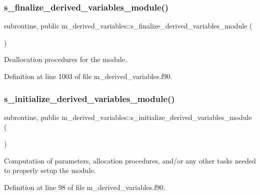 \subsubsection{\texorpdfstring{s\+\_\+finalize\+\_\+derived\+\_\+variables\+\_\+module()}{s\_finalize\_derived\_variables\_module()}}
{\footnotesize\ttfamily subroutine, public m\+\_\+derived\+\_\+variables\+::s\+\_\+finalize\+\_\+derived\+\_\+variables\+\_\+module (\begin{DoxyParamCaption}{ }\end{DoxyParamCaption})}



Deallocation procedures for the module. 



Definition at line 1003 of file m\+\_\+derived\+\_\+variables.\+f90.

\mbox{\label{namespacem__derived__variables_a15a6d70e2bd1c9b7001c753ca1f2ee27}} 
\subsubsection{\texorpdfstring{s\+\_\+initialize\+\_\+derived\+\_\+variables\+\_\+module()}{s\_initialize\_derived\_variables\_module()}}
{\footnotesize\ttfamily subroutine, public m\+\_\+derived\+\_\+variables\+::s\+\_\+initialize\+\_\+derived\+\_\+variables\+\_\+module (\begin{DoxyParamCaption}{ }\end{DoxyParamCaption})}



Computation of parameters, allocation procedures, and/or any other tasks needed to properly setup the module. 



Definition at line 98 of file m\+\_\+derived\+\_\+variables.\+f90.

\mbox{\label{namespacem__derived__variables_a2604318b4c2822441b485a32c755e5b6}} 
